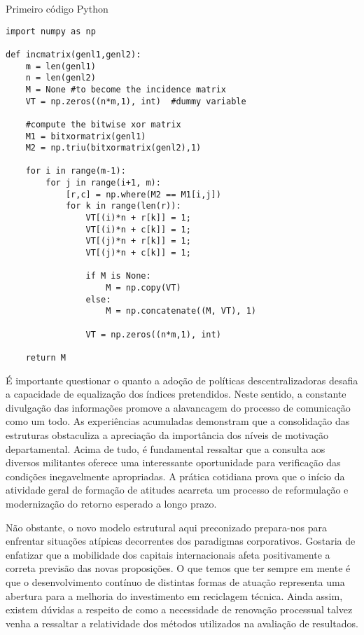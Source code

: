 \begin{listing}[H]
    \caption{Primeiro código Python}
    \label{labelPython}
	\begin{verbatim}
import numpy as np
 
def incmatrix(genl1,genl2):
    m = len(genl1)
    n = len(genl2)
    M = None #to become the incidence matrix
    VT = np.zeros((n*m,1), int)  #dummy variable
 
    #compute the bitwise xor matrix
    M1 = bitxormatrix(genl1)
    M2 = np.triu(bitxormatrix(genl2),1) 
 
    for i in range(m-1):
        for j in range(i+1, m):
            [r,c] = np.where(M2 == M1[i,j])
            for k in range(len(r)):
                VT[(i)*n + r[k]] = 1;
                VT[(i)*n + c[k]] = 1;
                VT[(j)*n + r[k]] = 1;
                VT[(j)*n + c[k]] = 1;
 
                if M is None:
                    M = np.copy(VT)
                else:
                    M = np.concatenate((M, VT), 1)
 
                VT = np.zeros((n*m,1), int)
 
    return M
	\end{verbatim}
\end{listing}

É importante questionar o quanto a adoção de políticas descentralizadoras desafia a capacidade de equalização dos índices pretendidos. Neste sentido, a constante divulgação das informações promove a alavancagem do processo de comunicação como um todo. As experiências acumuladas demonstram que a consolidação das estruturas obstaculiza a apreciação da importância dos níveis de motivação departamental. Acima de tudo, é fundamental ressaltar que a consulta aos diversos militantes oferece uma interessante oportunidade para verificação das condições inegavelmente apropriadas. A prática cotidiana prova que o início da atividade geral de formação de atitudes acarreta um processo de reformulação e modernização do retorno esperado a longo prazo. 

Não obstante, o novo modelo estrutural aqui preconizado prepara-nos para enfrentar situações atípicas decorrentes dos paradigmas corporativos. Gostaria de enfatizar que a mobilidade dos capitais internacionais afeta positivamente a correta previsão das novas proposições. O que temos que ter sempre em mente é que o desenvolvimento contínuo de distintas formas de atuação representa uma abertura para a melhoria do investimento em reciclagem técnica. Ainda assim, existem dúvidas a respeito de como a necessidade de renovação processual talvez venha a ressaltar a relatividade dos métodos utilizados na avaliação de resultados. 


